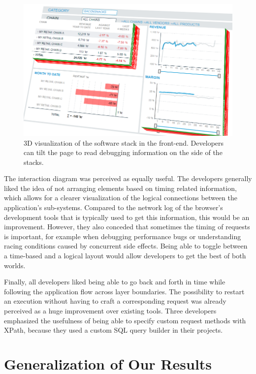 \begin{figure}
	\centering
		\includegraphics[width=1.00\linewidth]{img/pos3d.png}
	\caption{3D visualization of the software stack in the front-end. Developers can tilt the page to read debugging information on the side of the stacks.}
	\label{fig:3d}
\end{figure}

The interaction diagram was perceived as equally useful.
The developers generally liked the idea of not arranging elements based on timing related information, which allows for a clearer visualization of the logical connections between the application's sub-systems.
Compared to the network log of the browser's development tools that is typically used to get this information, this would be an improvement.
However, they also conceded that sometimes the timing of requests is important, for example when debugging performance bugs or understanding racing conditions caused by concurrent side effects.
Being able to toggle between a time-based and a logical layout would allow developers to get the best of both worlds.

Finally, all developers liked being able to go back and forth in time while following the application flow across layer boundaries.
The possibility to restart an execution without having to craft a corresponding request was already perceived as a huge improvement over existing tools.
Three developers emphasized the usefulness of being able to specify custom request methods with XPath, because they used a custom SQL query builder in their projects.

\section{Generalization of Our Results}

